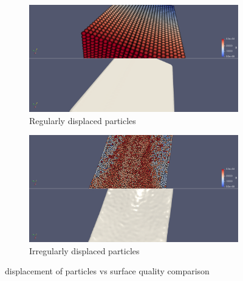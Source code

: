 \begin{figure}[h]
	\begin{center}
		\begin{subfigure}[b]{0.6\textwidth}
			\includegraphics[width=\textwidth]{figures/FlatSurfaceWsParticleDisplacement.png}
			\caption{Regularly displaced particles}
		\end{subfigure}
		\begin{subfigure}[b]{0.6\textwidth}
			\includegraphics[width=\textwidth]{figures/NonFlatSurfaceWsParticleDisplacement.png}
			\caption{Irregularly displaced particles}
		\end{subfigure}
	\end{center}
	\caption{displacement of particles vs surface quality comparison}
	\label{fig:rec_vs_displacement}
\end{figure}
